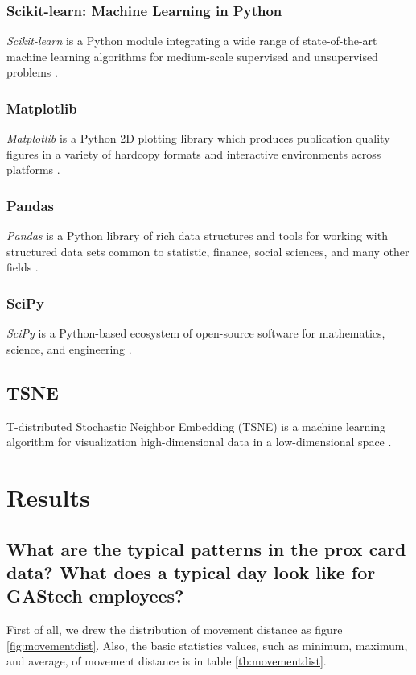 \documentclass[aps, 10pt, a4paper]{article}
\begin{document}
            \subsubsection{Scikit-learn: Machine Learning in Python}
                \textit{Scikit-learn} is a Python module integrating a wide range of state-of-the-art machine learning algorithms for medium-scale supervised and unsupervised problems \cite{ref:sklearn1}.
                
            \subsubsection{Matplotlib}
                \textit{Matplotlib} is a Python 2D plotting library which produces publication quality figures in a variety of hardcopy formats and interactive environments across platforms \cite{ref:matplotlib1}.
                
            \subsubsection{Pandas}
                \textit{Pandas} is a Python library of rich data structures and tools for working with structured data sets common to statistic, finance, social sciences, and many other fields \cite{ref:pandas1}.
                
            \subsubsection{SciPy}
                \textit{SciPy} is a Python-based ecosystem of open-source software for mathematics, science, and engineering \cite{ref:scipy1}.
            
        \subsection{TSNE}
            T-distributed Stochastic Neighbor Embedding (TSNE) is a machine learning algorithm for visualization high-dimensional data in a low-dimensional space \cite{ref:tsne1}.
    
    \section{Results}
        \subsection[Question 1]{What are the typical patterns in the prox card data? What does a typical day look like for GAStech employees?}
            First of all, we drew the distribution of movement distance as figure \ref{fig:movementdist}. Also, the basic statistics values, such as minimum, maximum, and average, of movement distance is in table \ref{tb:movementdist}.
            
\end{document}

